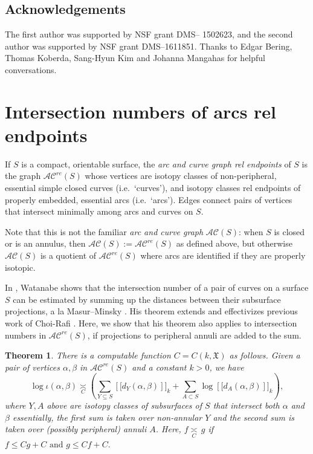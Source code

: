 \documentclass[11pt]{amsart}
\newtheorem{theorem}{Theorem}[section]
\theoremstyle{remark}
\numberwithin{equation}{section}
\newcommand{\cAC}{\mathcal{AC}}
\newcommand{\acre}{\cAC^{re}}
\begin{document}
 
\subsection{Acknowledgements}  The first author was supported by NSF grant DMS-- 1502623, and the second author was supported by NSF grant DMS--1611851. Thanks to Edgar Bering, Thomas Koberda, Sang-Hyun Kim and Johanna Mangahas for helpful conversations.

\section{Intersection numbers of arcs rel endpoints}

\label{MMW}



If $S$ is a compact, orientable surface, the \emph{arc and curve graph rel endpoints} of $S$ is the graph $\cAC^{re}(S)$  whose vertices are isotopy classes of non-peripheral, essential simple closed curves (i.e.~`curves'), and isotopy classes rel endpoints of properly embedded, essential arcs (i.e.~`arcs').  Edges connect pairs of vertices that 
intersect minimally among arcs and curves on $S$.

 Note that this  is
not the familiar \emph{arc and curve graph} $\cAC(S)$: when $S$ is closed or is an annulus, then $\cAC(S) := \acre(S)$ as defined above, but otherwise $\cAC(S)$ is a quotient of $\acre(S)$ where arcs are identified if they are properly isotopic. 

\vspace{2mm}


In \cite{Watanabe}, Watanabe shows  that the intersection number of a pair of curves on a surface $S$  can be estimated by summing up the distances between their subsurface projections, a la Masur--Minsky \cite{Masurgeometry2}. His theorem extends and effectivizes previous work of Choi-Rafi \cite{Choicomparison}. Here, we show that his theorem also applies to intersection numbers in $\acre(S)$, if projections to peripheral annuli are added to the sum.



\begin{theorem}\label{mm}There  is a computable function  $C=C(k,\mathfrak X)$ as follows. Given a pair of  vertices $\alpha,\beta$ in $\acre(S)$ and a constant $k>0$, we have
\[
\log \iota( \alpha ,  \beta) \underset{C}{\asymp} \left(  
\sum_{Y\subseteq S}  \left[[ d_Y( \alpha, \beta) \right]]_k +
\sum_{A\subset S} \log  \left[[ d_A( \alpha, \beta) \right]]_k  \right),
\] 
where $Y,A$ above are isotopy classes of subsurfaces of $S$ that intersect both $\alpha$ and $\beta$  essentially, the first sum is taken over non-annular $Y$ and the second sum is taken over (possibly peripheral) annuli $A$. Here, $f \underset{C}{\asymp} \, g$ if $f \leq C g +C \text{ and } g \leq Cf+C.$
\end{theorem}
\end{document}
